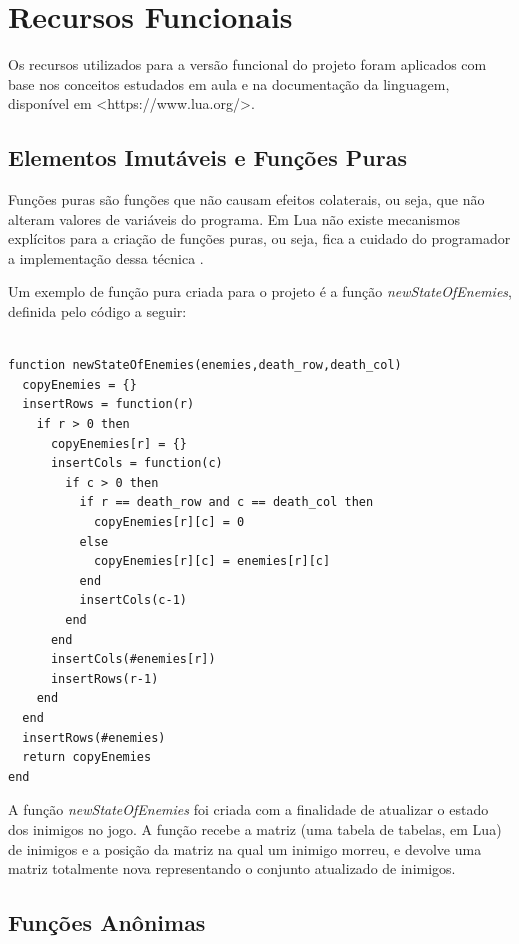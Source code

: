 \documentclass[rel_mlp]{iiufrgs}
\begin{document}

\chapter{Recursos Funcionais}

Os recursos utilizados para a versão funcional do projeto foram aplicados com base nos conceitos estudados em aula e na documentação da linguagem, disponível em <https://www.lua.org/>.

\section{Elementos Imutáveis e Funções Puras}

Funções puras são funções que não causam efeitos colaterais, ou seja, que não alteram valores de variáveis do programa. Em Lua não existe mecanismos explícitos para a criação de funções puras, ou seja, fica a cuidado do programador a implementação dessa técnica \cite{ImmutableObjectsLua}.

Um exemplo de função pura criada para o projeto é a função \textit{newStateOfEnemies}, definida pelo código a seguir:

\begin{lstlisting}[frame=single]

function newStateOfEnemies(enemies,death_row,death_col)
  copyEnemies = {}
  insertRows = function(r)
    if r > 0 then
      copyEnemies[r] = {}
      insertCols = function(c)
        if c > 0 then
          if r == death_row and c == death_col then
            copyEnemies[r][c] = 0
          else
            copyEnemies[r][c] = enemies[r][c]
          end
          insertCols(c-1)
        end
      end
      insertCols(#enemies[r])
      insertRows(r-1)
    end
  end
  insertRows(#enemies)
  return copyEnemies
end

\end{lstlisting}

A função \textit{newStateOfEnemies} foi criada com a finalidade de atualizar o estado dos inimigos no jogo. A função recebe a matriz (uma tabela de tabelas, em Lua) de inimigos e a posição da matriz na qual um inimigo morreu, e devolve uma matriz totalmente nova representando o conjunto atualizado de inimigos. 


\section{Funções Anônimas}
\end{document}

